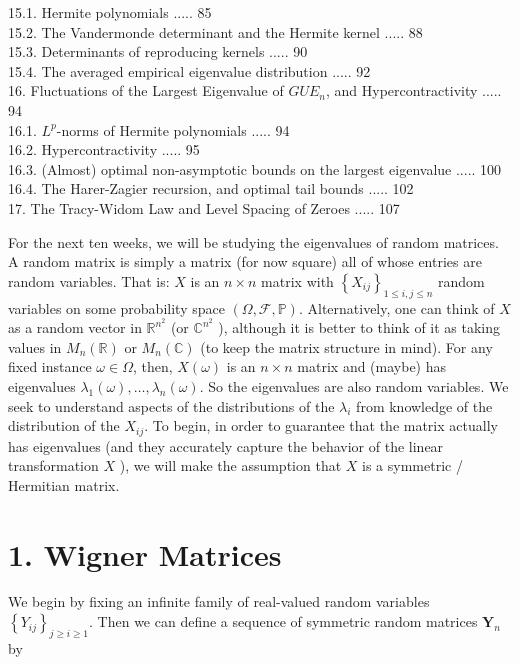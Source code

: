 \documentclass[10pt]{article}
\begin{document}
\captionsetup{singlelinecheck=false}
15.1. Hermite polynomials ..... 85\\
15.2. The Vandermonde determinant and the Hermite kernel ..... 88\\
15.3. Determinants of reproducing kernels ..... 90\\
15.4. The averaged empirical eigenvalue distribution ..... 92\\
16. Fluctuations of the Largest Eigenvalue of $G U E_{n}$, and Hypercontractivity ..... 94\\
16.1. $L^{p}$-norms of Hermite polynomials ..... 94\\
16.2. Hypercontractivity ..... 95\\
16.3. (Almost) optimal non-asymptotic bounds on the largest eigenvalue ..... 100\\
16.4. The Harer-Zagier recursion, and optimal tail bounds ..... 102\\
17. The Tracy-Widom Law and Level Spacing of Zeroes ..... 107

For the next ten weeks, we will be studying the eigenvalues of random matrices. A random matrix is simply a matrix (for now square) all of whose entries are random variables. That is: $X$ is an $n \times n$ matrix with $\left\{X_{i j}\right\}_{1 \leq i, j \leq n}$ random variables on some probability space $(\Omega, \mathscr{F}, \mathbb{P})$. Alternatively, one can think of $X$ as a random vector in $\mathbb{R}^{n^{2}}$ (or $\mathbb{C}^{n^{2}}$ ), although it is better to think of it as taking values in $M_{n}(\mathbb{R})$ or $M_{n}(\mathbb{C})$ (to keep the matrix structure in mind). For any fixed instance $\omega \in \Omega$, then, $X(\omega)$ is an $n \times n$ matrix and (maybe) has eigenvalues $\lambda_{1}(\omega), \ldots, \lambda_{n}(\omega)$. So the eigenvalues are also random variables. We seek to understand aspects of the distributions of the $\lambda_{i}$ from knowledge of the distribution of the $X_{i j}$. To begin, in order to guarantee that the matrix actually has eigenvalues (and they accurately capture the behavior of the linear transformation $X$ ), we will make the assumption that $X$ is a symmetric / Hermitian matrix.

\section*{1. Wigner Matrices}
We begin by fixing an infinite family of real-valued random variables $\left\{Y_{i j}\right\}_{j \geq i \geq 1}$. Then we can define a sequence of symmetric random matrices $\mathbf{Y}_{n}$ by
\end{document}
